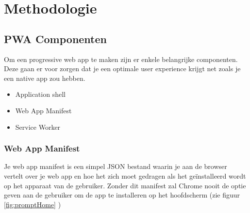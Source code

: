 
\chapter{Methodologie}
\label{ch:methodologie}


\section{PWA Componenten}
Om een progressive web app te maken zijn er enkele belangrijke componenten. Deze gaan er voor zorgen dat je een optimale user experience krijgt net zoals je een native app zou hebben.
\begin{itemize}  
	\item Application shell
	\item Web App Manifest
	\item Service Worker
\end{itemize}

\subsection{Web App Manifest}
Je web app manifest is een simpel JSON bestand waarin je aan de browser vertelt over je web app en hoe het zich moet gedragen als het geïnstalleerd wordt op het apparaat van de gebruiker. Zonder dit manifest zal Chrome nooit de optie geven aan de gebruiker om de app te installeren op het hoofdscherm (zie figuur \ref{fig:promptHome} ) \\

